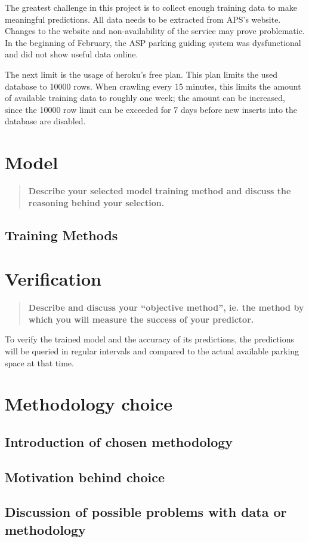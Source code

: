 \documentclass[journal,10pt]{IEEEtran}
\newcommand{\subtask}[1]{\begin{quote}\textbf{#1}\end{quote}}
\begin{document}
The greatest challenge in this project is to collect enough training data to make meaningful predictions. All data needs to be extracted from APS's website. Changes to the website and non-availability of the service may prove problematic. In the beginning of February, the ASP parking guiding system was dysfunctional and did not show useful data online. 

The next limit is the usage of heroku's free plan. This plan limits the used database to 10000 rows. When crawling every 15 minutes, this limits the amount of available training data to roughly one week; the amount can be increased, since the 10000 row limit can be exceeded for 7 days before new inserts into the database are disabled.


\section{Model}
\subtask{Describe your selected model training method and discuss the reasoning behind your selection.}
\subsection{Training Methods} 

\section{Verification}
\subtask{Describe and discuss your ``objective method'', ie. the method by which you will measure the success of your predictor.}
To verify the trained model and the accuracy of its predictions, the predictions will be queried in regular intervals and compared to the actual available parking space at that time. 

\section{Methodology choice}

\subsection{Introduction of chosen methodology}

\subsection{Motivation behind choice}

\subsection{Discussion of possible problems with data or methodology}
\end{document}
